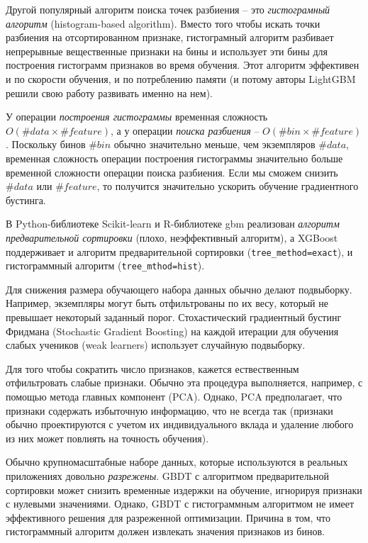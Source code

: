 \documentclass[%
	11pt,
	a4paper,
	utf8,
		]{article}
\begin{document}
Другой популярный алгоритм поиска точек разбиения -- это \emph{гистограмный алгоритм} (histogram-based algorithm). Вместо того чтобы искать точки разбиения на отсортированном признаке, гистограмный алгоритм разбивает непрерывные вещественные признаки на бины и использует эти бины для построения гистограмм признаков во время обучения. Этот алгоритм эффективен и по скорости обучения, и по потреблению памяти (и потому авторы LightGBM решили свою работу развивать именно на нем).

У операции \emph{построения гистограммы} временная сложность $ O(\#data \times \#feature) $, а у операции \emph{поиска разбиения} -- $ O(\#bin \times \#feature) $. Поскольку бинов $ \#bin $ обычно значительно меньше, чем экземпляров $ \#data $, временная сложность операции построения гистограммы значительно больше временной сложности операции поиска разбиения. Если мы сможем снизить $ \#data $ или $ \#feature $, то получится значительно ускорить обучение градиентного бустинга.

В Python-библиотеке Scikit-learn и R-библиотеке gbm реализован \emph{алгоритм предварительной сортировки} (плохо, неэффективный алгоритм), а XGBoost поддерживает и алгоритм предварительной сортировки (\verb|tree_method=exact|), и гистограммный алгоритм (\verb|tree_mthod=hist|). 

Для снижения размера обучающего набора данных обычно делают подвыборку. Например, экземпляры могут быть отфильтрованы по их весу, который не превышает некоторый заданный порог. Стохастический градиентный бустинг Фридмана (Stochastic Gradient Boosting) на каждой итерации для обучения слабых учеников (weak learners) использует случайную подвыборку.

Для того чтобы сократить число признаков, кажется ествественным отфильтровать слабые признаки. Обычно эта процедура выполняется, например, с помощью метода главных компонент (PCA). Однако, PCA предполагает, что признаки содержать избыточную информацию, что не всегда так (признаки обычно проектируются с учетом их индивидуального вклада и удаление любого из них может повлиять на точность обучения).

Обычно крупномасштабные наборе данных, которые используются в реальных приложениях довольно \emph{разрежены}. GBDT с алгоритмом предварительной сортировки может снизить временные издержки на обучение, игнорируя признаки с нулевыми значениями. Однако, GBDT с гистограммным алгоритмом не имеет эффективного решения для разреженной оптимизации. Причина в том, что гистограммный алгоритм должен извлекать значения признаков из бинов.
\end{document}
